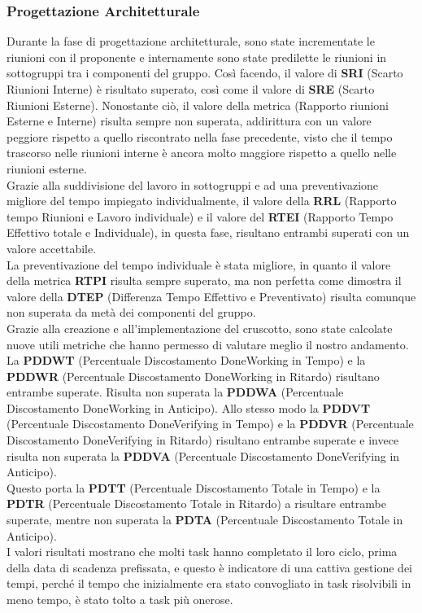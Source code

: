 \subsubsection{Progettazione Architetturale}
Durante la fase di progettazione architetturale, sono state incrementate le riunioni con il proponente e internamente sono state predilette le riunioni in sottogruppi tra i componenti del gruppo. Così facendo,
il valore di \textbf{SRI} (Scarto Riunioni Interne) è risultato superato, così come il valore di \textbf{SRE} (Scarto Riunioni Esterne). Nonostante ciò, il valore della metrica (Rapporto riunioni Esterne e Interne) risulta sempre non superata, addirittura con un valore peggiore rispetto a quello riscontrato nella fase precedente, visto che il tempo trascorso nelle riunioni interne è ancora molto maggiore rispetto a quello nelle riunioni esterne.\\
Grazie alla suddivisione del lavoro in sottogruppi e ad una preventivazione migliore del tempo impiegato individualmente, il valore della \textbf{RRL} (Rapporto tempo Riunioni e Lavoro individuale) e il valore del \textbf{RTEI} (Rapporto Tempo Effettivo totale e Individuale), in questa fase, risultano entrambi superati con un valore accettabile. \\
La preventivazione del tempo individuale è stata migliore, in quanto il valore della metrica \textbf{RTPI} risulta sempre superato, ma non perfetta come dimostra il valore della \textbf{DTEP} (Differenza Tempo Effettivo e Preventivato) risulta comunque non superata da metà dei componenti del gruppo.\\
Grazie alla creazione e all'implementazione del cruscotto, sono state calcolate nuove utili metriche che hanno permesso di valutare meglio il nostro andamento. \\
La \textbf{PDDWT} (Percentuale Discostamento DoneWorking in Tempo) e la \textbf{PDDWR} (Percentuale Discostamento DoneWorking in Ritardo) risultano entrambe superate. Risulta non superata la \textbf{PDDWA} (Percentuale Discostamento DoneWorking in Anticipo). Allo stesso modo la \textbf{PDDVT} (Percentuale Discostamento DoneVerifying in Tempo) e la \textbf{PDDVR} (Percentuale Discostamento DoneVerifying in Ritardo) risultano entrambe superate e invece risulta non superata la \textbf{PDDVA} (Percentuale Discostamento DoneVerifying in Anticipo). \\ Questo porta la \textbf{PDTT} (Percentuale Discostamento Totale in Tempo) e la \textbf{PDTR} (Percentuale Discostamento Totale in Ritardo) a risultare entrambe superate, mentre non superata la \textbf{PDTA} (Percentuale Discostamento Totale in Anticipo).\\ I valori risultati mostrano che molti task hanno completato il loro ciclo, prima della data di scadenza prefissata, e questo è indicatore di una cattiva gestione dei tempi, perché il tempo che inizialmente era stato convogliato in task risolvibili in meno tempo, è stato tolto a task più onerose.\\
